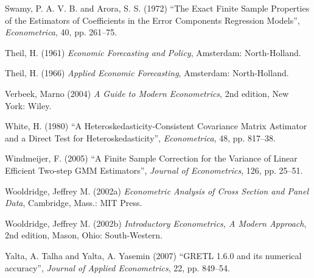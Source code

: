 \begin{thebibliography}
  Swamy, P. A. V. B. and Arora, S. S. (1972) ``The Exact Finite Sample
  Properties of the Estimators of Coefficients in the Error Components
  Regression Models'', \emph{Econometrica}, 40, pp. 261--75.  

  Theil, H. (1961) \emph{Economic Forecasting and Policy}, Amsterdam:
  North-Holland.

  Theil, H. (1966) \emph{Applied Economic Forecasting}, Amsterdam:
  North-Holland.

  Verbeek, Marno (2004) \emph{A Guide to Modern Econometrics}, 2nd
  edition, New York: Wiley.

  White, H. (1980) ``A Heteroskedasticity-Consistent Covariance Matrix
  Astimator and a Direct Test for Heteroskedasticity'',
  \emph{Econometrica}, 48, pp. 817--38.

  Windmeijer, F. (2005) ``A Finite Sample Correction for the Variance
  of Linear Efficient Two-step GMM Estimators'', \emph{Journal of
    Econometrics}, 126, pp. 25--51.
  
  Wooldridge, Jeffrey M. (2002a) \emph{Econometric Analysis of Cross
    Section and Panel Data}, Cambridge, Mass.: MIT Press.

  Wooldridge, Jeffrey M. (2002b) \emph{Introductory Econometrics, A
    Modern Approach}, 2nd edition, Mason, Ohio: South-Western.

  Yalta, A. Talha and Yalta, A. Yasemin (2007) ``GRETL 1.6.0 and its
  numerical accuracy'', \emph{Journal of Applied Econometrics}, 22,
  pp. 849--54.

\end{thebibliography}


